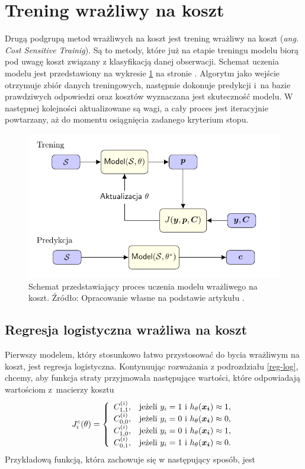 \documentclass[inzynierska]{pwr_wmat_praca_dyplomowa}
\theoremstyle{plain}
\numberwithin{theorem}{chapter}
\theoremstyle{definition}
\numberwithin{theorem}{chapter}
\begin{document}
\section{Trening wrażliwy na koszt}
Drugą podgrupą metod wrażliwych na koszt jest trening wrażliwy na koszt (\textit{ang. Cost Sensitive Trainig}). Są to metody, które już na etapie treningu modelu biorą pod uwagę koszt związany z klasyfikacją danej obserwacji. Schemat uczenia modelu jest przedstawiony na wykresie \ref{cst} na stronie \pageref{cst}. Algorytm jako wejście otrzymuje zbiór danych treningowych, następnie dokonuje predykcji i~na bazie prawdziwych odpowiedzi oraz kosztów wyznaczana jest skuteczność modelu. W następnej kolejności aktualizowane są wagi, a cały proces jest iteracyjnie powtarzany, aż do momentu osiągnięcia zadanego kryterium stopu.
\begin{figure}[h]
	\includegraphics[width=\linewidth]{plots/cost_sensitive_training.pdf}
	\caption{Schemat przedstawiający proces uczenia modelu wrażliwego na koszt. Źródło: Opracowanie własne na podstawie artykułu \cite{RMoser}.}
	\label{cst}
\end{figure}	

\subsection{Regresja logistyczna wrażliwa na koszt}
\label{cslr}
Pierwszy modelem, który stosunkowo łatwo przystosować do bycia wrażliwym na koszt, jest regresja logistyczna. Kontynuując rozważania z podrozdziału \ref{reg-log}, chcemy, aby funkcja straty przyjmowała następujące wartości, które odpowiadają wartościom z~macierzy kosztu
$$
J^c_i(\theta)=\left\{
\begin{array}{rl}
C^{(i)}_{1,1}, &\mbox{jeżeli $y_i = 1$ i $h_{\theta}(\boldsymbol{x_i}) \approx 1$}, \\
C^{(i)}_{0,0}, &\mbox{jeżeli $y_i = 0$ i $h_{\theta}(\boldsymbol{x_i}) \approx 0$}, \\
C^{(i)}_{1,0}, &\mbox{jeżeli $y_i = 0$ i $h_{\theta}(\boldsymbol{x_i}) \approx 1$}, \\
C^{(i)}_{0,1}, &\mbox{jeżeli $y_i = 1$ i $h_{\theta}(\boldsymbol{x_i}) \approx 0$}.
\end{array}
\right.
$$
Przykładową funkcją, która zachowuje się w następujący sposób, jest
\end{document}
